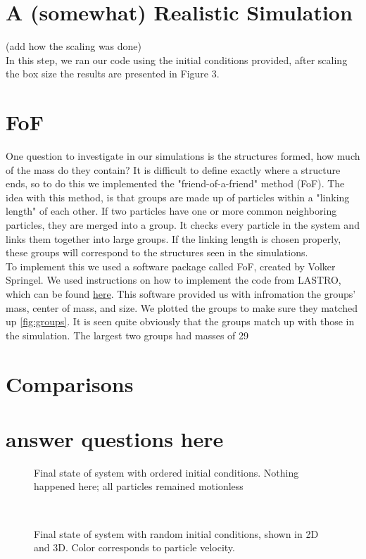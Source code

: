 \documentclass[10pt]{article}
\begin{document}
\section{A (somewhat) Realistic Simulation}
(add how the scaling was done)\\ 
	In this step, we ran our code using the initial conditions provided, after scaling the box size the results are presented in Figure 3.   
\section{FoF}
One question to investigate in our simulations is the structures formed, how much of the mass do they contain? It is difficult to define exactly where a structure ends, so to do this we implemented the "friend-of-a-friend" method (FoF). The idea with this method, is that groups are made up of particles within a "linking length" of each other. If two particles have one or more common neighboring particles, they are merged into a group. It checks every particle in the system and links them together into large groups. If the linking length is chosen properly, these groups will correspond to the structures seen in the simulations.\\
To implement this we used a software package called FoF, created by Volker Springel. We used instructions on how to implement the code from LASTRO, which can be found \href{http://obswww.unige.ch/lastro/misc/TP4/doc/rst/Exercices/Ex05.html#extracting-haloes}{here}. This software provided us with infromation the groups' mass, center of mass, and size. We plotted the groups to make sure they matched up \ref{fig:groups}{}. It is seen quite obviously that the groups match up with those in the simulation. The largest two groups had masses of 29%
\section{Comparisons}
\section{answer questions here}
\begin{figure}[htbp]
\centering

\caption{Final state of system with ordered initial conditions. Nothing happened here; all particles remained motionless}
\end{figure}

\begin{figure}[htbp]
\centering
\begin{subfigure}{\textwidth}
\centering

\end{subfigure} \\
\begin{subfigure}{\textwidth}
\centering

\end{subfigure}
\caption{Final state of system with random initial conditions, shown in 2D and 3D. Color corresponds to particle velocity.}
\end{figure}
\end{document}
